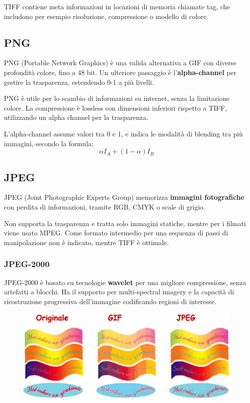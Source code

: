 TIFF contiene meta informazioni in locazioni di memoria chiamate tag, che includono per esempio risoluzione, compressione o modello di colore.

 \subsection{PNG}
 PNG (Portable Network Graphics) è una valida alternativa a GIF con diverse profondità colore, fino a 48 bit. Un ulteriore passaggio è l'\textbf{alpha-channel} per gestire la trasparenza, estendendo 0-1 a più livelli. 
 
 PNG è utile per lo scambio di informazioni su internet, senza la limitazione colore. La compressione è lossless con dimensioni inferiori rispetto a TIFF, utilizzando un alpha channel per la trasparenza.
 
 L'alpha-channel assume valori tra 0 e 1, e indica le modalità di blending tra più immagini, secondo la formula:
 $$\alpha I_A + (1 - \alpha) I_B$$
 
 \subsection{JPEG}
 JPEG (Joint Photographic Experts Group) memorizza \textbf{immagini fotografiche} con perdita di informazioni, tramite RGB, CMYK o scale di grigio.
 
 Non supporta la trasparenza e tratta solo immagini statiche, mentre per i filmati viene usato MPEG. Come formato intermedio per una sequenza di passi di manipolazione non è indicato, mentre TIFF è ottimale.
 
 \subsubsection{JPEG-2000}
 JPEG-2000 è basato su tecnologie \textbf{wavelet} per una migliore compressione, senza artefatti a blocchi. Ha il supporto per multi-spectral imagery e la capacità di ricostruzione progressiva dell'immagine codificando regioni di interesse.
 
 \begin{figure}[h]
 	\centering
 	\includegraphics[scale=0.4]{Lezioni/Immagini/formati}
 \end{figure}
 
